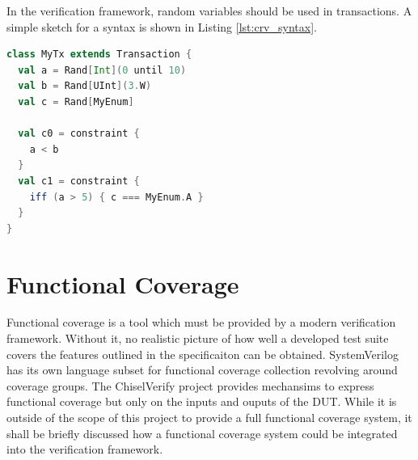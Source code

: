 In the verification framework, random variables should be used in transactions. A simple sketch for a syntax is shown
in Listing \ref{lst:crv_syntax}.

\begin{listing}
\begin{lstlisting}[language=scala, captionpos=b, caption=Outline of the syntax for random variables and constraints.,label=lst:crv_syntax]
class MyTx extends Transaction {
  val a = Rand[Int](0 until 10)
  val b = Rand[UInt](3.W)
  val c = Rand[MyEnum]

  val c0 = constraint {
    a < b
  }
  val c1 = constraint {
    iff (a > 5) { c === MyEnum.A }
  }
}
\end{lstlisting}
\end{listing}

\section{Functional Coverage} %

Functional coverage is a tool which must be provided by a modern verification framework. Without it, no realistic
picture of how well a developed test suite covers the features outlined in the specificaiton can be obtained.
SystemVerilog has its own language subset for functional coverage collection revolving around coverage groups. The
ChiselVerify project provides mechansims to express functional coverage but only on the inputs and ouputs of the DUT.
While it is outside of the scope of this project to provide a full functional coverage system, it shall be briefly
discussed how a functional coverage system could be integrated into the verification framework.


